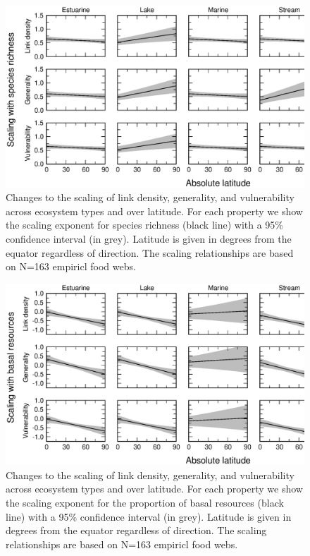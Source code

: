 \documentclass[12pt]{article}
\begin{document}

\begin{figure}[h]
\includegraphics[width=.85\textwidth]{Figures/by_TL/marginal/S_marginal_latitude_proportions.eps}
\caption{Changes to the scaling of link density, generality, and vulnerability across ecosystem
types and over latitude. For each property we show the scaling exponent for species richness (black
line) with a 95\% confidence interval (in grey). Latitude is given in degrees from the equator
regardless of direction. The scaling relationships are based on N=163 empiricl food webs.}
\label{S}
\end{figure}


\begin{figure}[!H]
\includegraphics[width=.85\textwidth]{Figures/by_TL/marginal/B_marginal_latitude_proportions.eps}
\caption{Changes to the scaling of link density, generality, and vulnerability across ecosystem
types and over latitude. For each property we show the scaling exponent for the proportion of
basal resources (black line) with a 95\% confidence interval (in grey). Latitude is given in degrees
from the equator regardless of direction. The scaling relationships are based on N=163 empiricl food webs.}
\label{B}
\end{figure}
\end{document}
